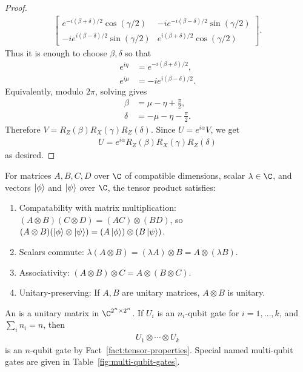 \begin{proof}
\begin{align}
\begin{bmatrix}
e^{-i(\beta+\delta)/2}\cos(\gamma/2)
&
-i e^{-i(\beta-\delta)/2}\sin(\gamma/2)
\\
-i e^{i(\beta-\delta)/2}\sin(\gamma/2)
&
e^{i(\beta+\delta)/2}\cos(\gamma/2)
\end{bmatrix}.
\end{align}
Thus it is enough to choose $\beta,\delta$ so that
\begin{align}
e^{i\eta} &= e^{-i(\beta+\delta)/2}, \\
e^{i\mu} &= -i e^{i(\beta-\delta)/2}.
\end{align}
Equivalently, modulo $2\pi$, solving gives
\begin{align}
\beta &= \mu-\eta+\frac{\pi}{2}, \\
\delta &= -\mu-\eta-\frac{\pi}{2}.
\end{align}
Therefore $V = R_Z(\beta)R_X(\gamma)R_Z(\delta)$. Since $U=e^{i\alpha}V$, we get
\begin{align}
U = e^{i\alpha}R_Z(\beta)R_X(\gamma)R_Z(\delta)
\end{align}
as desired.
\end{proof}

\begin{fact} 
\label{fact:tensor-properties}
For matrices $A,B,C,D$ over $\C$ of compatible dimensions, scalar $\lambda \in \C$, and vectors $\ket\phi$ and $\ket\psi$ over $\C$, the tensor product satisfies:
\begin{enumerate}
    \item Compatability with matrix multiplication: $(A \otimes B)(C \otimes D) = (AC) \otimes (BD)$, so $(A \otimes B)(\ket\phi \otimes \ket\psi) = (A\ket\phi) \otimes (B\ket\psi)$.
    \item Scalars commute: $\lambda(A \otimes B) = (\lambda A) \otimes B = A \otimes (\lambda B)$.
    \item Associativity: $(A \otimes B) \otimes C = A \otimes (B \otimes C)$.
    \item Unitary-preserving: If $A,B$ are unitary matrices, $A \otimes B$ is unitary.
\end{enumerate}
\end{fact}

\begin{definition}
    An  is a unitary matrix in
    \(\C^{2^n\times 2^n}\). If \(U_i\) is an \(n_i\)-qubit gate for
    \(i=1,\ldots,k\), and \(\sum_i n_i=n\), then
    \begin{align}
        U_1\otimes\cdots\otimes U_k
    \end{align}
    is an \(n\)-qubit gate by Fact~\ref{fact:tensor-properties}.
    Special named multi-qubit gates are given in Table~\ref{fig:multi-qubit-gates}.
\end{definition}

